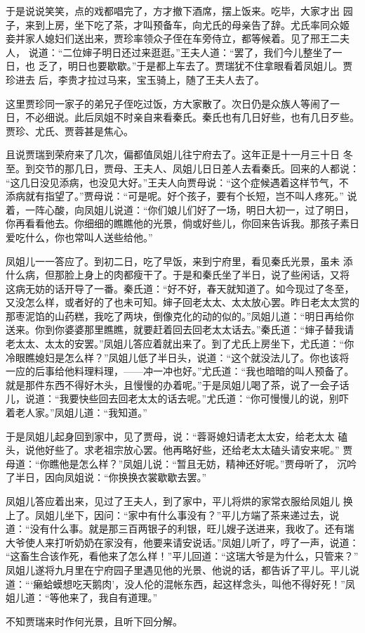 于是说说笑笑，点的戏都唱完了，方才撤下酒席，摆上饭来。吃毕，大家才出
园子，来到上房，坐下吃了茶，才叫预备车，向尤氏的母亲告了辞。尤氏率同众姬
妾并家人媳妇们送出来，贾珍率领众子侄在车旁侍立，都等候着。见了邢王二夫人，
说道：“二位婶子明日还过来逛逛。”王夫人道：“罢了，我们今儿整坐了一日，也
乏了，明日也要歇歇。”于是都上车去了。贾瑞犹不住拿眼看着凤姐儿。贾珍进去
后，李贵才拉过马来，宝玉骑上，随了王夫人去了。

这里贾珍同一家子的弟兄子侄吃过饭，方大家散了。次日仍是众族人等闹了一
日，不必细说。此后凤姐不时亲自来看秦氏。秦氏也有几日好些，也有几日歹些。
贾珍、尤氏、贾蓉甚是焦心。

且说贾瑞到荣府来了几次，偏都值凤姐儿往宁府去了。这年正是十一月三十日
冬至。到交节的那几日，贾母、王夫人、凤姐儿日日差人去看秦氏。回来的人都说：
“这几日没见添病，也没见大好。”王夫人向贾母说：“这个症候遇着这样节气，不
添病就有指望了。”贾母说：“可是呢。好个孩子，要有个长短，岂不叫人疼死。”
说着，一阵心酸，向凤姐儿说道：“你们娘儿们好了一场，明日大初一，过了明日，
你再看看他去。你细细的瞧瞧他的光景，倘或好些儿，你回来告诉我。那孩子素日
爱吃什么，你也常叫人送些给他。”

凤姐儿一一答应了。到初二日，吃了早饭，来到宁府里，看见秦氏光景，虽未
添什么病，但那脸上身上的肉都瘦干了。于是和秦氏坐了半日，说了些闲话，又将
这病无妨的话开导了一番。秦氏道：“好不好，春天就知道了。如今现过了冬至，
又没怎么样，或者好的了也未可知。婶子回老太太、太太放心罢。昨日老太太赏的
那枣泥馅的山药糕，我吃了两块，倒像克化的动的似的。”凤姐儿道：“明日再给你
送来。你到你婆婆那里瞧瞧，就要赶着回去回老太太话去。”秦氏道：“婶子替我请
老太太、太太的安罢。”凤姐儿答应着就出来了。到了尤氏上房坐下，尤氏道：“你
冷眼瞧媳妇是怎么样？”凤姐儿低了半日头，说道：“这个就没法儿了。你也该将
一应的后事给他料理料理，——冲一冲也好。”尤氏道：“我也暗暗的叫人预备了。
就是那件东西不得好木头，且慢慢的办着呢。”于是凤姐儿喝了茶，说了一会子话
儿，说道：“我要快些回去回老太太的话去呢。”尤氏道：“你可慢慢儿的说，别吓
着老人家。”凤姐儿道：“我知道。”

于是凤姐儿起身回到家中，见了贾母，说：“蓉哥媳妇请老太太安，给老太太
磕头，说他好些了。求老祖宗放心罢。他再略好些，还给老太太磕头请安来呢。”
贾母道：“你瞧他是怎么样？”凤姐儿说：“暂且无妨，精神还好呢。”贾母听了，
沉吟了半日，因向凤姐说：“你换换衣裳歇歇去罢。”

凤姐儿答应着出来，见过了王夫人，到了家中，平儿将烘的家常衣服给凤姐儿
换上了。凤姐儿坐下，因问：“家中有什么事没有？”平儿方端了茶来递过去，说
道：“没有什么事。就是那三百两银子的利银，旺儿嫂子送进来，我收了。还有瑞
大爷使人来打听奶奶在家没有，他要来请安说话。”凤姐儿听了，哼了一声，说道：
“这畜生合该作死，看他来了怎么样！”平儿回道：“这瑞大爷是为什么，只管来？”
凤姐儿遂将九月里在宁府园子里遇见他的光景、他说的话，都告诉了平儿。平儿说
道：“‘癞蛤蟆想吃天鹅肉’，没人伦的混帐东西，起这样念头，叫他不得好死！”凤
姐儿道：“等他来了，我自有道理。”

不知贾瑞来时作何光景，且听下回分解。